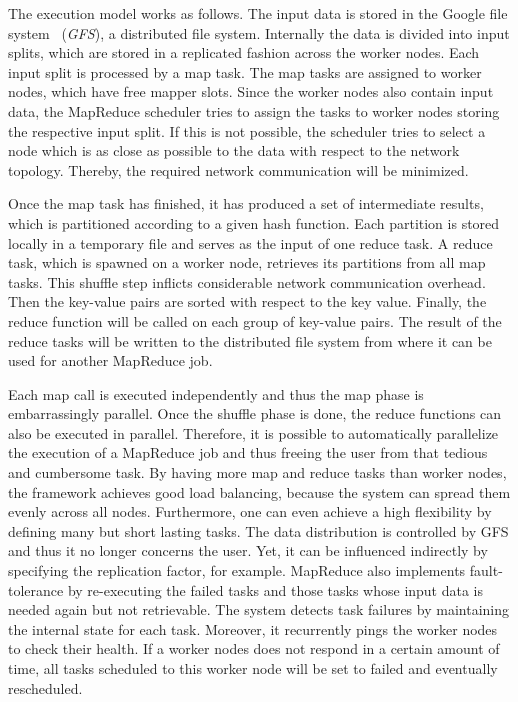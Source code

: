 The execution model works as follows.
The input data is stored in the Google file system~\cite{ghemawat:2003a} (\emph{GFS}), a distributed file system.
Internally the data is divided into input splits, which are stored in a replicated fashion across the worker nodes.
Each input split is processed by a map task.
The map tasks are assigned to worker nodes, which have free mapper slots.
Since the worker nodes also contain input data, the MapReduce scheduler tries to assign the tasks to worker nodes storing the respective input split.
If this is not possible, the scheduler tries to select a node which is as close as possible to the data with respect to the network topology.
Thereby, the required network communication will be minimized.

Once the map task has finished, it has produced a set of intermediate results, which is partitioned according to a given hash function.
Each partition is stored locally in a temporary file and serves as the input of one reduce task.
A reduce task, which is spawned on a worker node, retrieves its partitions from all map tasks.
This shuffle step inflicts considerable network communication overhead.
Then the key-value pairs are sorted with respect to the key value.
Finally, the reduce function will be called on each group of key-value pairs.
The result of the reduce tasks will be written to the distributed file system from where it can be used for another MapReduce job.

Each map call is executed independently and thus the map phase is embarrassingly parallel.
Once the shuffle phase is done, the reduce functions can also be executed in parallel.
Therefore, it is possible to automatically parallelize the execution of a MapReduce job and thus freeing the user from that tedious and cumbersome task.
By having more map and reduce tasks than worker nodes, the framework achieves good load balancing, because the system can spread them evenly across all nodes.
Furthermore, one can even achieve a high flexibility by defining many but short lasting tasks.
The data distribution is controlled by GFS and thus it no longer concerns the user.
Yet, it can be influenced indirectly by specifying the replication factor, for example.
MapReduce also implements fault-tolerance by re-executing the failed tasks and those tasks whose input data is needed again but not retrievable.
The system detects task failures by maintaining the internal state for each task.
Moreover, it recurrently pings the worker nodes to check their health.
If a worker nodes does not respond in a certain amount of time, all tasks scheduled to this worker node will be set to failed and eventually rescheduled.

